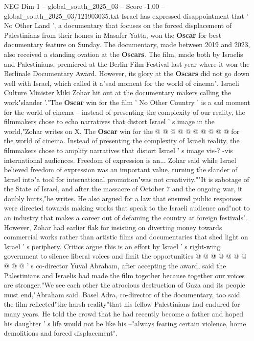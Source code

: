 \begin{textsample}{NEG Dim 1 – global\_south\_2025\_03 – Score -1.00 – global\_south\_2025\_03/121903035.txt}  \label{ex:f1_neg_157}
Israel has expressed disappointment that ' No Other Land ', a documentary that focuses on the forced displacement of Palestinians from their homes in Masafer Yatta, won the \textbf{Oscar} for best documentary feature on Sunday.
The documentary, made between 2019 and 2023, also received a standing ovation at the \textbf{Oscars}.
The film, made both by Israelis and Palestinians, premiered at the Berlin Film Festival last year where it won the Berlinale Documentary Award.
However, its glory at the \textbf{Oscars} did not go down well with Israel, which called it a"sad moment for the world of cinema".
Israeli Culture Minister Miki Zohar hit out at the documentary makers calling the work"slander '."The \textbf{Oscar} win for the film ' No Other Country ' is a sad moment for the world of cinema -- instead of presenting the complexity of our reality, the filmmakers chose to echo narratives that distort Israel ' s image in the world,"Zohar writes on X.
The \textbf{Oscar} win for the @ @ @ @ @ @ @ @ @ @ for the world of cinema.
Instead of presenting the complexity of Israeli reality, the filmmakers chose to amplify narratives that distort Israel ' s image vis-? -vis international audiences.
Freedom of expression is an...
Zohar said while Israel believed freedom of expression was an important value, turning the slander of Israel into"a tool for international promotion"was not creativity.""It is sabotage of the State of Israel, and after the massacre of October 7 and the ongoing war, it doubly hurts,"he writes.
He also argued for a law that ensured public responses were directed towards making works that speak to the Israeli audience and"not to an industry that makes a career out of defaming the country at foreign festivals".
However, Zohar had earlier flak for insisting on diverting money towards commercial works rather than artistic films and documentaries that shed light on Israel ' s periphery.
Critics argue this is an effort by Israel ' s right-wing government to silence liberal voices and limit the opportunities @ @ @ @ @ @ @ @ @ @ ' s co-director Yuval Abraham, after accepting the award, said the Palestinians and Israelis had made the film together because together our voices are stronger."We see each other the atrocious destruction of Gaza and its people must end,"Abraham said.
Basel Adra, co-director of the documentary, too said the film reflected"the harsh reality"that his fellow Palestinians had endured for many years.
He told the crowd that he had recently become a father and hoped his daughter ' s life would not be like his --"always fearing certain violence, home demolitions and forced displacement".

\end{textsample}
